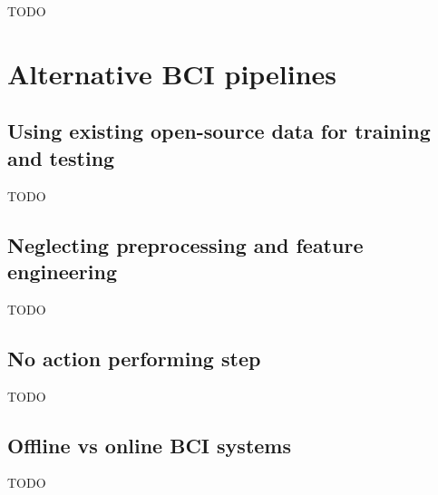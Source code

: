 TODO



\section{Alternative BCI pipelines}
\label{sec:processing_signals_alternative_pipelines}


\subsection{Using existing open-source data for training and testing}
\label{subsec:processing_signals_alternative_pipelines_using_existing_data}

TODO


\subsection{Neglecting preprocessing and feature engineering}
\label{subsec:processing_signals_alternative_pipelines_no_preprocessing_and_features}

TODO


\subsection{No action performing step}
\label{subsec:processing_signals_alternative_pipelines_no_actions}


TODO


\subsection{Offline vs online BCI systems}
\label{subsec:processing_signals_alternative_pipelines_offline_vs_online}

TODO



